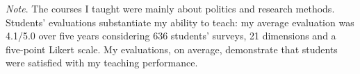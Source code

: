\begin{publications}
{\footnotesize {\itshape Note}. The courses I taught were mainly about politics and research methods. Students’ evaluations substantiate my ability to teach: my average evaluation was 4.1/5.0 over five years considering 636 students’ surveys, 21 dimensions and a five-point Likert scale. My evaluations, on average, demonstrate that students were satisfied with my teaching performance.}

\vspace{1mm}
\end{publications}

